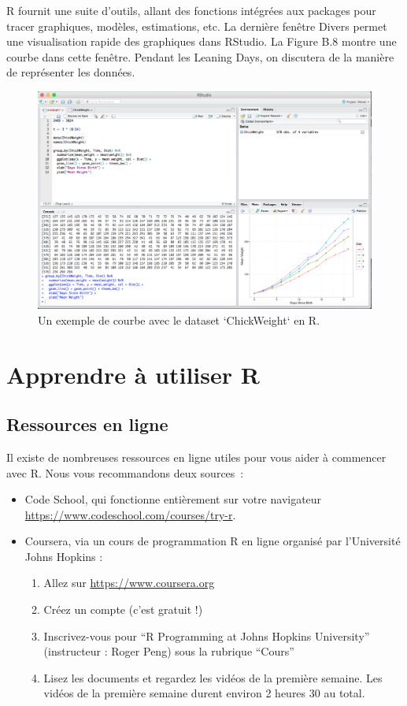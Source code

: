 \documentclass[
  12pt,
]{book}
\providecommand{\tightlist}{%
  \setlength{\itemsep}{0pt}\setlength{\parskip}{0pt}}
\begin{document}
R fournit une suite d'outils, allant des fonctions intégrées aux packages pour tracer graphiques, modèles, estimations, etc. La dernière fenêtre Divers permet une visualisation rapide des graphiques dans RStudio. La Figure B.8 montre une courbe dans cette fenêtre. Pendant les Leaning Days, on discutera de la manière de représenter les données.

\begin{figure}
\includegraphics[width=0.6\linewidth]{Images/graph} \caption{Un exemple de courbe avec le dataset `ChickWeight` en R.}\label{fig:graph}
\end{figure}

\hypertarget{apprendre-uxe0-utiliser-r}{%
\section{Apprendre à utiliser R}\label{apprendre-uxe0-utiliser-r}}

\hypertarget{ressources-en-ligne}{%
\subsection{Ressources en ligne}\label{ressources-en-ligne}}

Il existe de nombreuses ressources en ligne utiles pour vous aider à commencer avec R. Nous vous recommandons deux sources~:

\begin{itemize}
\tightlist
\item
  Code School, qui fonctionne entièrement sur votre navigateur \url{https://www.codeschool.com/courses/try-r}.
\item
  Coursera, via un cours de programmation R en ligne organisé par l'Université Johns Hopkins :

  \begin{enumerate}
  \def\labelenumi{\roman{enumi}.}
  \tightlist
  \item
    Allez sur \url{https://www.coursera.org}
  \item
    Créez un compte (c'est gratuit !)
  \item
    Inscrivez-vous pour ``R Programming at Johns Hopkins University'' (instructeur : Roger Peng) sous la rubrique ``Cours''
  \item
    Lisez les documents et regardez les vidéos de la première semaine. Les vidéos de la première semaine durent environ 2 heures 30 au total.
  \end{enumerate}
\end{itemize}
\end{document}
